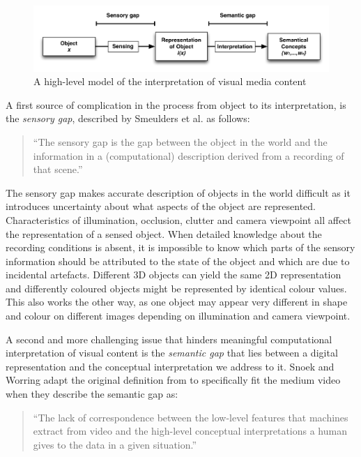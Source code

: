 \begin{figure}[htbp]
  \centering
    \includegraphics[width=.9\textwidth]{img/understanding_visuals}
  \caption{A high-level model of the interpretation of visual media content}
  \label{fig:understanding_visuals}
\end{figure}

A first source of complication in the process from object to its interpretation, is the \emph{sensory gap}, described by Smeulders et al. as follows:

\begin{quote}
  ``The sensory gap is the gap between the object in the world and the information in a (computational) description derived from a recording of that scene.''\cite{Smeulders:2000tx}
\end{quote}

The sensory gap makes accurate description of objects in the world difficult as it introduces uncertainty about what aspects of the object are represented. Characteristics of illumination, occlusion, clutter and camera viewpoint all affect the representation of a sensed object. When detailed knowledge about the recording conditions is absent, it is impossible to know which parts of the sensory information should be attributed to the state of the object and which are due to incidental artefacts. Different 3D objects can yield the same 2D representation and differently coloured objects might be represented by identical colour values. This also works the other way, as one object may appear very different in shape and colour on different images depending on illumination and camera viewpoint.

A second and more challenging issue that hinders meaningful computational interpretation of visual content is the \emph{semantic gap} that lies between a digital representation and the conceptual interpretation we address to it. Snoek and Worring adapt the original definition from \cite{Smeulders:2000tx} to specifically fit the medium video when they describe the semantic gap as:

\begin{quote}
  ``The lack of correspondence between the low-level features that machines extract from video and the high-level conceptual interpretations a human gives to the data in a given situation.''\cite{Snoek:2009dq}
\end{quote}

